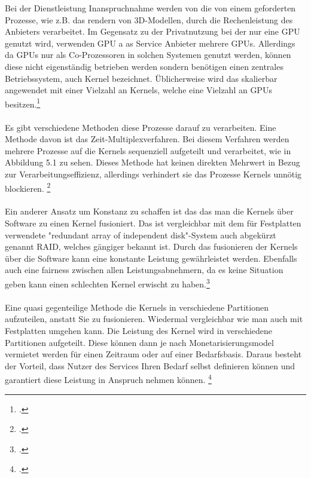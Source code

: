 \documentclass[12pt,toc=bib,toc=listof]{scrreprt}
\begin{document}
Bei der Dienstleistung Inanspruchnahme werden von die von einem geforderten
Prozesse, wie z.B. das rendern von 3D-Modellen, durch die Rechenleistung des 
Anbieters verarbeitet. Im Gegensatz zu der Privatnutzung bei der nur eine GPU genutzt wird, 
verwenden GPU a as Service Anbieter mehrere GPUs. 
Allerdings da GPUs nur als Co-Prozessoren in solchen Systemen genutzt werden, 
können diese nicht eigenständig betrieben werden sondern benötigen einen zentrales 
Betriebssystem, auch Kernel bezeichnet. Üblicherweise wird das skalierbar angewendet mit einer
Vielzahl an Kernels, welche eine Vielzahl an GPUs besitzen.\footcite [Vgl.] [] {Wang.2017}
\\%
\\%
Es gibt verschiedene Methoden diese Prozesse darauf zu verarbeiten. Eine Methode davon 
ist das Zeit-Multiplexverfahren. Bei diesem Verfahren werden mehrere Prozesse auf die Kernels
sequenziell aufgeteilt und verarbeitet, wie in Abbildung 5.1 zu sehen. Dieses Methode 
hat keinen direkten Mehrwert in Bezug zur Verarbeitungseffizienz, allerdings verhindert 
sie das Prozesse Kernels unnötig blockieren. \footcite [Vgl.] [] {Wang.2017}
\\ \\
Ein anderer Ansatz um Konstanz zu schaffen ist das das man die Kernels über Software zu einen Kernel fusioniert. 
Das ist vergleichbar mit dem für Festplatten verwendete "redundant array of independent disk"-System auch abgekürzt genannt RAID, 
welches gängiger bekannt ist. Durch das fusionieren der Kernels über die Software kann eine 
konstante Leistung gewährleistet werden.
Ebenfalls auch eine fairness zwischen allen Leistungsabnehmern, da es keine Situation geben kann einen schlechten Kernel erwischt zu haben.\footcite [Vgl.] [] {Wang.2017}
\\ \\
Eine quasi gegenteilige Methode die Kernels in verschiedene Partitionen aufzuteilen, anstatt Sie zu fusionieren.
Wiedermal vergleichbar wie man auch mit Festplatten umgehen kann. Die Leistung des Kernel wird 
in verschiedene Partitionen aufgeteilt. Diese können dann je nach Monetarisierungsmodel 
vermietet werden für einen Zeitraum oder auf einer Bedarfsbasis. Daraus besteht der Vorteil, 
dass Nutzer des Services Ihren Bedarf selbst definieren können und garantiert diese Leistung 
in Anspruch nehmen können. \footcite [Vgl.] [] {Wang.2017}
\end{document}
